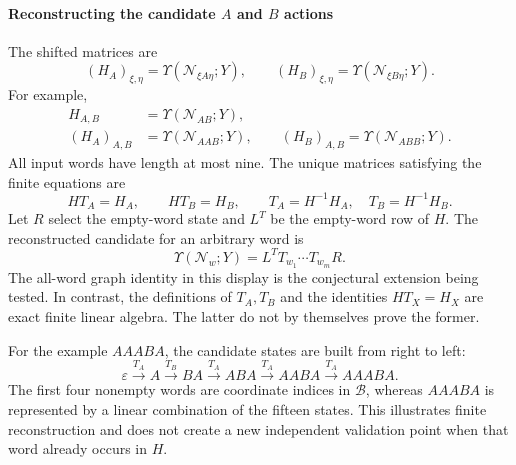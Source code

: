 \documentclass[10pt,twocolumn]{article}
\begin{document}
\paragraph{Reconstructing the candidate $A$ and $B$ actions}
\label{supp:transfer_hankel_reconstruction}
The shifted matrices are
\begin{equation}
(H_A)_{\xi,\eta}=\Upsilon(\mathcal N_{\xi A\eta};Y),\qquad
(H_B)_{\xi,\eta}=\Upsilon(\mathcal N_{\xi B\eta};Y).
\label{supp:deriv:eq:hankel_matrices}
\end{equation}
For example,
\begin{equation}
\begin{aligned}
H_{A,B}&=\Upsilon(\mathcal N_{AB};Y),\\
(H_A)_{A,B}&=\Upsilon(\mathcal N_{AAB};Y),\qquad
(H_B)_{A,B}=\Upsilon(\mathcal N_{ABB};Y).
\end{aligned}
\label{supp:deriv:eq:hankel_examples}
\end{equation}
All input words have length at most nine. The unique matrices satisfying the finite equations are
\begin{equation}
HT_A=H_A,\qquad HT_B=H_B,
\qquad\boxed{T_A=H^{-1}H_A,\quad T_B=H^{-1}H_B.}
\label{supp:deriv:eq:TA_TB}
\end{equation}
Let $R$ select the empty-word state and $L^T$ be the empty-word row of $H$. The reconstructed candidate for an arbitrary word is
\begin{equation}
\boxed{\Upsilon(\mathcal N_w;Y)=L^TT_{w_1}\cdots T_{w_m}R.}
\label{supp:deriv:eq:raw_word_transfer}
\end{equation}
The all-word graph identity in this display is the conjectural extension being tested. In contrast, the definitions of $T_A,T_B$ and the identities $HT_X=H_X$ are exact finite linear algebra. The latter do not by themselves prove the former.

For the example $AAABA$, the candidate states are built from right to left:
\begin{equation}
\varepsilon\xrightarrow{T_A}A\xrightarrow{T_B}BA\xrightarrow{T_A}ABA\xrightarrow{T_A}AABA\xrightarrow{T_A}AAABA.
\label{supp:deriv:eq:AAABA_state_path}
\end{equation}
The first four nonempty words are coordinate indices in $\mathcal B$, whereas $AAABA$ is represented by a linear combination of the fifteen states. This illustrates finite reconstruction and does not create a new independent validation point when that word already occurs in $H$.
\end{document}
